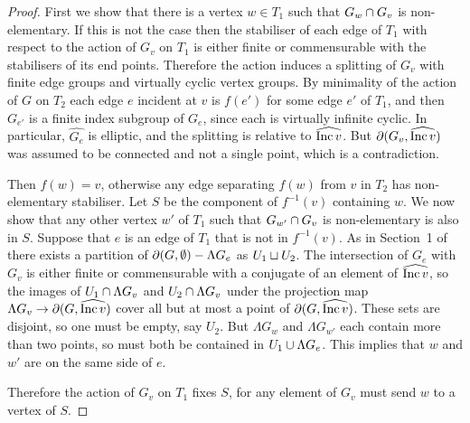 \begin{proof}
First we show that there is a vertex $w \in T_1$ such that $G_w \cap G_v$ is non-elementary. 
If this is not the case then the stabiliser of each edge of $T_1$ with respect to the action of $G_v$ on $T_1$ is either finite or commensurable with the stabilisers of its end points. 
Therefore the action induces a splitting of $G_v$ with finite edge groups and virtually cyclic vertex groups. %
By minimality of the action of $G$ on $T_2$ each edge $e$ incident at $v$ is $f(e')$ for some edge $e'$ of $T_1$, and then $G_{e'}$ is a finite index subgroup of $G_e$, since each is virtually infinite cyclic. 
In particular, $\widehat{ G_e}$ is elliptic, and the splitting is relative to $\widehat{\operatorname{\mathrm{Inc}} v}$.  
But $\partial(G_v, \widehat{\operatorname{\mathrm{Inc}} v})$ was assumed to be connected and not a single point, which is a contradiction.

Then $f(w) = v$, otherwise any edge separating $f(w)$ from $v$ in $T_2$ has non-elementary stabiliser. 
Let $S$ be the component of $f^{-1}(v)$ containing $w$. 
We now show that any other vertex $w'$ of $T_1$ such that $G_{w'} \cap G_v$ is non-elementary is also in $S$. 
Suppose that $e$ is an edge of $T_1$ that is not in $f^{-1}(v)$. 
As in Section~1 of~\cite{bowditch98} there exists a partition of $\partial(G, \emptyset) - \Lambda G_e$ as $U_1 \sqcup U_2$. 
The intersection of $G_e$ with $G_v$ is either finite or commensurable with a conjugate of an element of $\widehat{\operatorname{\mathrm{Inc}} v}$, so the images of $U_1 \cap \Lambda G_v$ and $U_2 \cap \Lambda G_v$ under the projection map $\Lambda G_v \to \partial(G, \widehat{\operatorname{\mathrm{Inc}} v})$ cover all but at most a point of $\partial(G, \widehat{\operatorname{\mathrm{Inc}} v})$. 
These sets are disjoint, so one must be empty, say $U_2$. 
But $\Lambda G_w$ and $\Lambda G_{w'}$ each contain more than two points, so must both be contained in $U_1 \cup \Lambda G_e$. 
This implies that $w$ and $w'$ are on the same side of $e$.

Therefore the action of $G_v$ on $T_1$ fixes $S$, for any element of $G_v$ must send $w$ to a vertex of $S$.
\end{proof}

